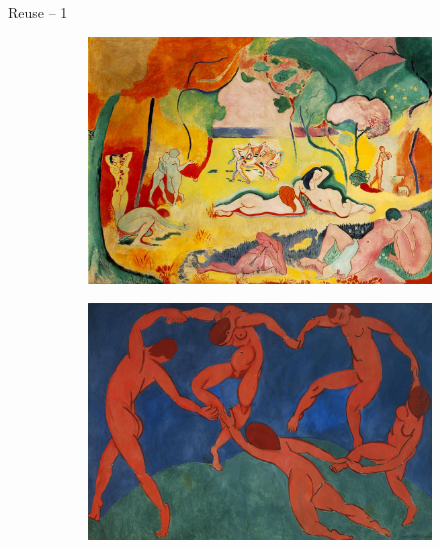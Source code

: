 \documentclass{beamer}
\begin{document}
\begin{frame}
{\centerline{Reuse -- 1}}

\begin{figure}
\centering
\begin{subfigure}{.5\textwidth}
  \centering
  \includegraphics[width=0.95\linewidth]{P2023.AIBCCSS.Drawing/joy-of-life.jpg}
\end{subfigure}%
\begin{subfigure}{.5\textwidth}
  \centering
  \includegraphics[width=0.95\linewidth]{P2023.AIBCCSS.Drawing/dance.jpg}
\end{subfigure}
\end{figure}

\end{frame}
\end{document}
